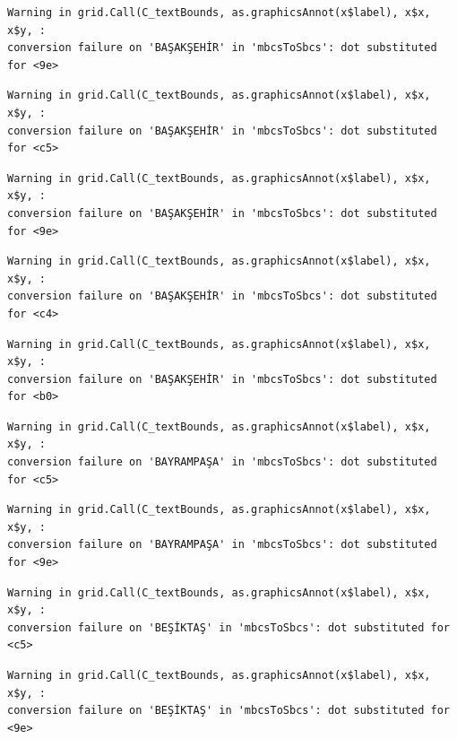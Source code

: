 \documentclass[
  11pt,
  a4paper,
  DIV=11,
  numbers=noendperiod]{scrartcl}
\begin{document}
\begin{verbatim}
Warning in grid.Call(C_textBounds, as.graphicsAnnot(x$label), x$x, x$y, :
conversion failure on 'BAŞAKŞEHİR' in 'mbcsToSbcs': dot substituted for <9e>
\end{verbatim}

\begin{verbatim}
Warning in grid.Call(C_textBounds, as.graphicsAnnot(x$label), x$x, x$y, :
conversion failure on 'BAŞAKŞEHİR' in 'mbcsToSbcs': dot substituted for <c5>
\end{verbatim}

\begin{verbatim}
Warning in grid.Call(C_textBounds, as.graphicsAnnot(x$label), x$x, x$y, :
conversion failure on 'BAŞAKŞEHİR' in 'mbcsToSbcs': dot substituted for <9e>
\end{verbatim}

\begin{verbatim}
Warning in grid.Call(C_textBounds, as.graphicsAnnot(x$label), x$x, x$y, :
conversion failure on 'BAŞAKŞEHİR' in 'mbcsToSbcs': dot substituted for <c4>
\end{verbatim}

\begin{verbatim}
Warning in grid.Call(C_textBounds, as.graphicsAnnot(x$label), x$x, x$y, :
conversion failure on 'BAŞAKŞEHİR' in 'mbcsToSbcs': dot substituted for <b0>
\end{verbatim}

\begin{verbatim}
Warning in grid.Call(C_textBounds, as.graphicsAnnot(x$label), x$x, x$y, :
conversion failure on 'BAYRAMPAŞA' in 'mbcsToSbcs': dot substituted for <c5>
\end{verbatim}

\begin{verbatim}
Warning in grid.Call(C_textBounds, as.graphicsAnnot(x$label), x$x, x$y, :
conversion failure on 'BAYRAMPAŞA' in 'mbcsToSbcs': dot substituted for <9e>
\end{verbatim}

\begin{verbatim}
Warning in grid.Call(C_textBounds, as.graphicsAnnot(x$label), x$x, x$y, :
conversion failure on 'BEŞİKTAŞ' in 'mbcsToSbcs': dot substituted for <c5>
\end{verbatim}

\begin{verbatim}
Warning in grid.Call(C_textBounds, as.graphicsAnnot(x$label), x$x, x$y, :
conversion failure on 'BEŞİKTAŞ' in 'mbcsToSbcs': dot substituted for <9e>
\end{verbatim}
\end{document}
